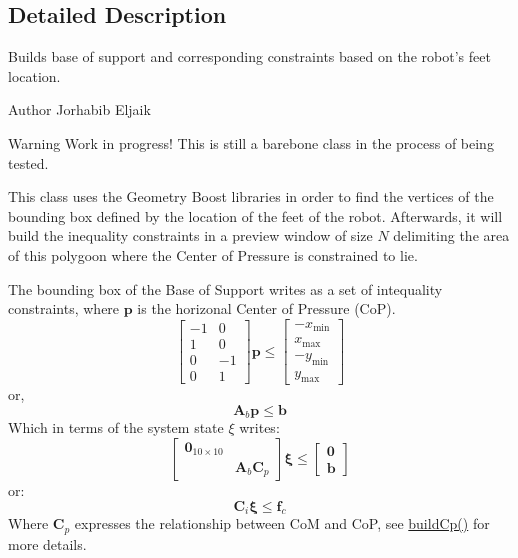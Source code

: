 \subsection{\-Detailed \-Description}
\-Builds base of support and corresponding constraints based on the robot's feet location. 

\begin{DoxyAuthor}{\-Author}
\-Jorhabib \-Eljaik \cite{ibanezThesis2015} 
\end{DoxyAuthor}
\begin{DoxyWarning}{\-Warning}
\-Work in progress! \-This is still a barebone class in the process of being tested.
\end{DoxyWarning}
\-This class uses the \-Geometry \-Boost libraries in order to find the vertices of the bounding box defined by the location of the feet of the robot. \-Afterwards, it will build the inequality constraints in a preview window of size $N$ delimiting the area of this polygoon where the \-Center of \-Pressure is constrained to lie.

\-The bounding box of the \-Base of \-Support writes as a set of intequality constraints, where $\mathbf{p}$ is the horizonal \-Center of \-Pressure (\-Co\-P). \[ \left[\begin{array}{cc} -1 & 0\\ 1 & 0\\ 0 & -1\\ 0 & 1 \end{array}\right] \mathbf{p} \leq \left[\begin{array}{c} -x_{\text{min}}\\ x_{\text{max}}\\ -y_{\text{min}}\\ y_{\text{max}} \end{array}\right] \] or, \[ \mathbf{A}_b\mathbf{p} \leq \mathbf{b} \] \-Which in terms of the system state $\xi$ writes\-: \[ \left[\begin{array}{cc} \mathbf{0}_{10\times10} & \\ & \mathbf{A}_b \mathbf{C}_p \end{array}\right] \mathbf{\xi} \leq \left[\begin{array}{c} \mathbf{0} \\ \mathbf{b} \end{array}\right] \] or\-: \[ \mathbf{C}_i \mathbf{\xi} \leq \mathbf{f}_c \] \-Where $\mathbf{C}_p$ expresses the relationship between \-Co\-M and \-Co\-P, see \hyperlink{classBaseOfSupport_a7efc6cad789632e88d8c85ab171a9eef}{build\-Cp()} for more details.


